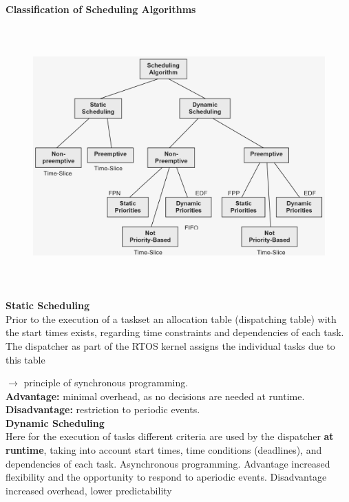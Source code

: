 {\rot\bf Classification of Scheduling Algorithms}

	\begin{figure}[h]
    \centering
    \includegraphics[width=15cm, height=10cm]{Images/image88.png}
    \label{fig:Fig }
    \end{figure}
    
{\rot\bf Static Scheduling}\\

Prior to the execution of a taskset an allocation table (dispatching table) with the start times exists, regarding time constraints and dependencies of each task. The dispatcher as part of the RTOS kernel assigns the individual tasks due to this table 

$\rightarrow$ principle of synchronous programming.\\

\textbf{Advantage: }  minimal overhead, as no decisions are needed at runtime. \\

\textbf{Disadvantage: }  restriction to periodic events.\\

{\rot\bf Dynamic Scheduling}\\

Here for the execution of tasks different criteria are used by the dispatcher \textbf{at runtime}, taking into account start times, time conditions (deadlines), and dependencies of each task. Asynchronous programming. Advantage  increased flexibility and the opportunity to respond to aperiodic events. Disadvantage  increased overhead, lower predictability\\

